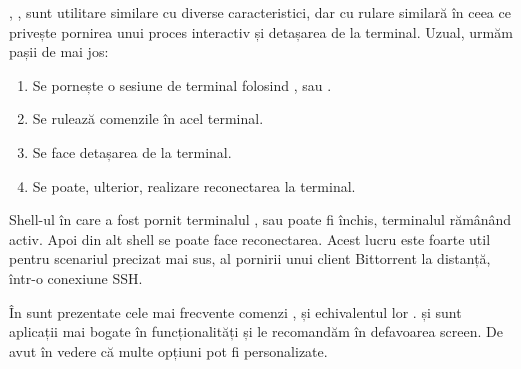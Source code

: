 
, ,  sunt utilitare similare cu diverse caracteristici, dar cu
rulare similară în ceea ce privește pornirea unui proces interactiv și detașarea
de la terminal. Uzual, urmăm pașii de mai jos:

\begin{enumerate}
  \item Se pornește o sesiune de terminal folosind ,  sau .
	\item Se rulează comenzile în acel terminal.
	\item Se face detașarea de la terminal.
	\item Se poate, ulterior, realizare reconectarea la terminal.
\end{enumerate}

Shell-ul în care a fost pornit terminalul ,  sau  poate fi
închis, terminalul rămânând activ. Apoi din alt shell se poate face
reconectarea. Acest lucru este foarte util pentru scenariul precizat mai sus, al
pornirii unui client Bittorrent la distanță, într-o conexiune SSH.

În  sunt prezentate cele mai frecvente comenzi ,  și echivalentul
lor .  și  sunt aplicații mai bogate în funcționalități și le
recomandăm în defavoarea screen. De avut în vedere că multe opțiuni pot fi personalizate.


